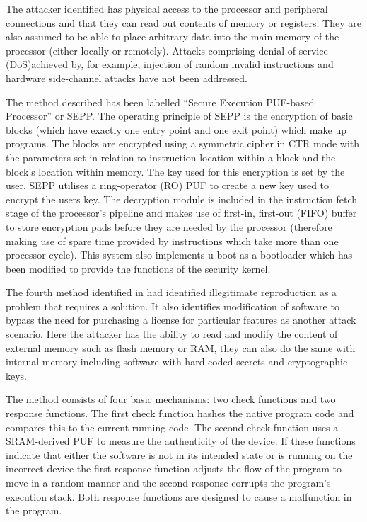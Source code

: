 The attacker identified has physical access to the processor and peripheral connections and that they can read out contents of memory or registers. They are also assumed to be able to place arbitrary data into the main memory of the processor (either locally or remotely). Attacks comprising denial-of-service (DoS)achieved by, for example, injection of random invalid instructions and hardware side-channel attacks have not been addressed.

The method described has been labelled ``Secure Execution PUF-based Processor'' or SEPP. The operating principle of SEPP is the encryption of basic blocks (which have exactly one entry point and one exit point) which make up programs. The blocks are encrypted using a symmetric cipher in CTR mode with the parameters set in relation to instruction location within a block and the block's location within memory. The key used for this encryption is set by the user. SEPP utilises a ring-operator (RO) PUF to create a new key used to encrypt the users key.  The decryption module is included in the instruction fetch stage of the processor's pipeline and makes use of first-in, first-out (FIFO) buffer to store encryption pads before they are needed by the processor (therefore making use of spare time provided by instructions which take more than one processor cycle). This system also implements u-boot as a bootloader which has been modified to provide the functions of the security kernel. 


The fourth method identified in \cite{Kohnhauser2015} had identified illegitimate reproduction as a problem that requires a solution. It also identifies modification of software to bypass the need for purchasing a license for particular features as another attack scenario. Here the attacker has the ability to read and modify the content of external memory such as flash memory or RAM, they can also do the same with internal memory including software with hard-coded secrets and cryptographic keys.

The method consists of four basic mechanisms: two check functions and two response functions. The first check function hashes the native program code and compares this to the current running code. The second check function uses a SRAM-derived PUF to measure the authenticity of the device. If these functions indicate that either the software is not in its intended state or is running on the incorrect device the first response function adjusts the flow of the program to move in a random manner  and the second response corrupts the program's execution stack. Both response functions are designed to cause a malfunction in the program.


